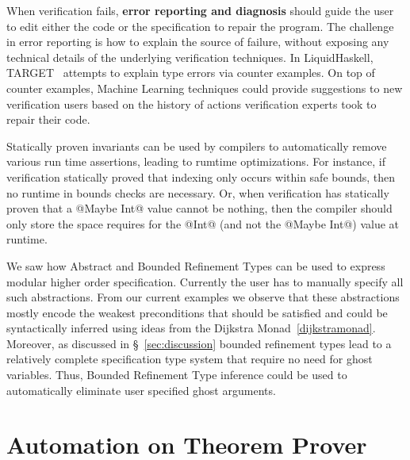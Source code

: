 When verification fails, 
\textbf{error reporting and diagnosis} should guide the user 
to edit either the code or the specification to repair the program. 
%
The challenge in error reporting is how to explain 
the source of failure, 
without exposing any technical details 
of the underlying verification techniques. 
%
In LiquidHaskell, TARGET~\cite{TARGET} attempts to explain 
type errors via counter examples. 
%
On top of counter examples, %
Machine Learning techniques could 
provide suggestions to new verification users
based on the history of actions verification experts 
took to repair their code.  
% 

Statically proven invariants can be used by compilers 
to automatically remove various run time assertions, 
leading to rumtime optimizations.
For instance, if verification statically proved that indexing only occurs
within safe bounds, then no runtime in bounds checks are necessary. 
%
Or, when verification has statically proven that a @Maybe Int@ value cannot be nothing, 
then the compiler should only store the space requires for the @Int@ (and not the @Maybe Int@)
value at runtime. 


\label{future:ghost}
We saw how Abstract and Bounded Refinement Types can be used to express 
modular higher order specification. 
%
Currently the user has to manually specify all such abstractions. 
From our current examples we observe that these abstractions mostly encode 
the weakest preconditions that should be satisfied and could be syntactically 
inferred using ideas from the Dijkstra Monad~\ref{dijkstramonad}. 
%
Moreover, as discussed in \S~\ref{sec:discussion}
bounded refinement types lead to a relatively complete 
specification type system that require no need for ghost variables. 
Thus, Bounded Refinement Type inference could be used to automatically eliminate 
user specified ghost arguments. 

\section{Automation on Theorem Prover}
\label{future:theoremproving}

